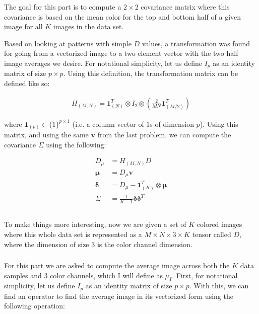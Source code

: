\documentclass{article}[12pt]
\begin{document}
	\subsubsection{}
	The goal for this part is to compute a $2 \times 2$ covariance matrix where this covariance is based on the mean color for the top and bottom half of a given image for all $K$ images in the data set. 
	
	Based on looking at patterns with simple $D$ values, a transformation was found for going from a vectorized image to a two element vector with the two half image averages we desire. For notational simplicity, let us define $I_p$ as an identity matrix of size $p \times p$. Using this definition, the transformation matrix can be defined like so:
	
	\begin{align*}
	H_{(M,N)} = \boldsymbol{1}_{(N)}^{T} \otimes I_2 \otimes \left( \frac{2}{MN} \boldsymbol{1}_{(M/2)}^{T}\right)
	\end{align*}
	
	where $\boldsymbol{1}_{(p)} \in \{1 \}^{p \times 1}$ (i.e. a column vector of $1$s of dimension $p$). Using this matrix, and using the same $\boldsymbol{v}$ from the last problem, we can compute the covariance $\Sigma$ using the following:
	
	\begin{align*}
	D_{\mu} &= H_{(M,N)}D \\
	\boldsymbol{\mu} &= D_{\mu} \boldsymbol{v} \\
	\boldsymbol{\delta} &= D_{\mu} - \boldsymbol{1}_{(K)}^{T} \otimes \boldsymbol{\mu} \\
	\Sigma &= \frac{1}{K-1} \boldsymbol{\delta} \boldsymbol{\delta}^{T}
	\end{align*}
	
	\subsection{}
	To make things more interesting, now we are given a set of $K$ colored images where this whole data set is represented as a $M \times N \times 3 \times K$ tensor called $D$, where the dimension of size 3 is the color channel dimension.
	
	\subsubsection{}
	For this part we are asked to compute the average image across both the $K$ data samples and $3$ color channels, which I will define as $\mu_I$. First, for notational simplicity, let us define $I_p$ as an identity matrix of size $p \times p$. With this, we can find an operator to find the average image in its vectorized form using the following operation:
	
\end{document}
